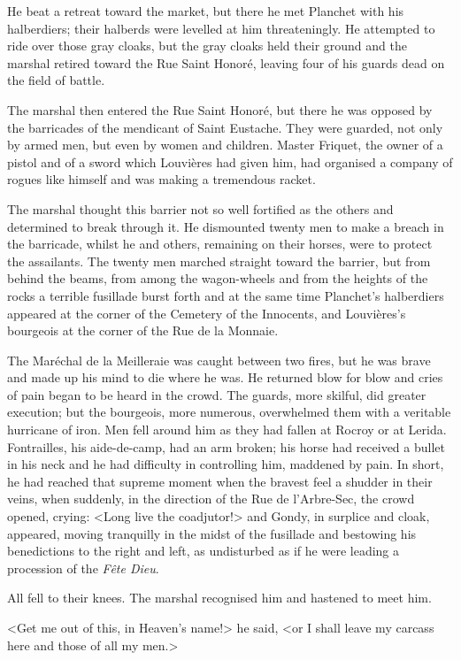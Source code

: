 He beat a retreat toward the market, but there he met Planchet with his halberdiers; their halberds were levelled at him threateningly. He attempted to ride over those gray cloaks, but the gray cloaks held their ground and the marshal retired toward the Rue Saint Honoré, leaving four of his guards dead on the field of battle.

The marshal then entered the Rue Saint Honoré, but there he was opposed by the barricades of the mendicant of Saint Eustache. They were guarded, not only by armed men, but even by women and children. Master Friquet, the owner of a pistol and of a sword which Louvières had given him, had organised a company of rogues like himself and was making a tremendous racket.

The marshal thought this barrier not so well fortified as the others and determined to break through it. He dismounted twenty men to make a breach in the barricade, whilst he and others, remaining on their horses, were to protect the assailants. The twenty men marched straight toward the barrier, but from behind the beams, from among the wagon-wheels and from the heights of the rocks a terrible fusillade burst forth and at the same time Planchet's halberdiers appeared at the corner of the Cemetery of the Innocents, and Louvières's bourgeois at the corner of the Rue de la Monnaie.

The Maréchal de la Meilleraie was caught between two fires, but he was brave and made up his mind to die where he was. He returned blow for blow and cries of pain began to be heard in the crowd. The guards, more skilful, did greater execution; but the bourgeois, more numerous, overwhelmed them with a veritable hurricane of iron. Men fell around him as they had fallen at Rocroy or at Lerida. Fontrailles, his aide-de-camp, had an arm broken; his horse had received a bullet in his neck and he had difficulty in controlling him, maddened by pain. In short, he had reached that supreme moment when the bravest feel a shudder in their veins, when suddenly, in the direction of the Rue de l'Arbre-Sec, the crowd opened, crying: <Long live the coadjutor!> and Gondy, in surplice and cloak, appeared, moving tranquilly in the midst of the fusillade and bestowing his benedictions to the right and left, as undisturbed as if he were leading a procession of the \textit{Fête Dieu}.

All fell to their knees. The marshal recognised him and hastened to meet him.

<Get me out of this, in Heaven's name!> he said, <or I shall leave my carcass here and those of all my men.>

